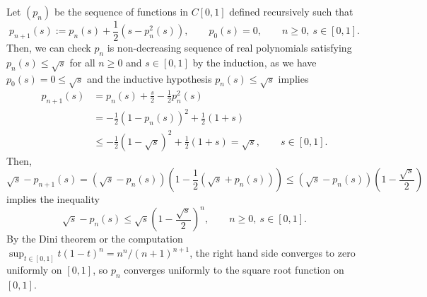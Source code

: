 \documentclass{../../large}
\begin{document}
\begin{prb}
\end{prb}
\begin{pf}
Let $(p_n)$ be the sequence of functions in $C[0,1]$ defined recursively such that
\[p_{n+1}(s):=p_n(s)+\frac12(s-p_n^2(s)),\qquad p_0(s)=0,\qquad n\ge0,\ s\in[0,1].\]
Then, we can check $p_n$ is non-decreasing sequence of real polynomials satisfying $p_n(s)\le\sqrt s$ for all $n\ge0$ and $s\in[0,1]$ by the induction, as we have $p_0(s)=0\le\sqrt s$ and the inductive hypothesis $p_n(s)\le\sqrt s$ implies
\begin{align*}
p_{n+1}(s)
&=p_n(s)+\frac s2-\frac12p_n^2(s)\\
&=-\frac12(1-p_n(s))^2+\frac12(1+s)\\
&\le-\frac12(1-\sqrt s)^2+\frac12(1+s)=\sqrt s,\qquad s\in[0,1].
\end{align*}
Then,
\[\sqrt s-p_{n+1}(s)=(\sqrt s-p_n(s))\left(1-\frac12(\sqrt s+ p_n(s))\right)\le(\sqrt s-p_n(s))\left(1-\frac{\sqrt s}2\right)\]
implies the inequality
\[\sqrt s-p_n(s)\le\sqrt s\left(1-\frac{\sqrt s}2\right)^n,\qquad n\ge0,\ s\in[0,1].\]
By the Dini theorem or the computation $\sup_{t\in[0,1]}t(1-t)^n=n^n/(n+1)^{n+1}$, the right hand side converges to zero uniformly on $[0,1]$, so $p_n$ converges uniformly to the square root function on $[0,1]$.
\end{pf}
\end{document}
